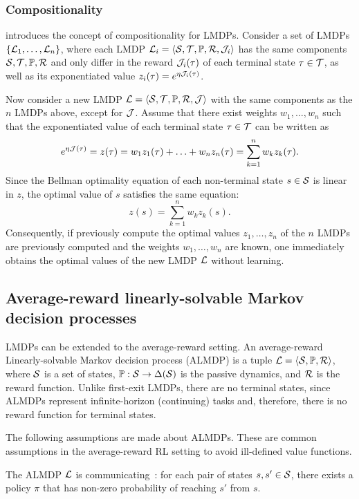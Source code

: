 \subsubsection{Compositionality}
\label{section:compositionality}
\citet{Todorov2009a} introduces the concept of compositionality for LMDPs. Consider a set of LMDPs $\{\mathcal{L}_1,\ldots,\mathcal{L}_n\}$, where each LMDP $\mathcal{L}_i=\langle\mathcal{S},\mathcal{T},\mathbb{P},\mathcal{R},\mathcal{J}_i\rangle$ has the same components $\mathcal{S},\mathcal{T},\mathbb{P},\mathcal{R}$ and only differ in the reward $\mathcal{J}_i(\tau)$ of each terminal state $\tau\in\mathcal{T}$, as well as its exponentiated value $z_i(\tau)=e^{\eta \mathcal{J}_i(\tau)}$.

Now consider a new LMDP $\mathcal{L}=\langle\mathcal{S},\mathcal{T},\mathbb{P},\mathcal{R},\mathcal{J}\rangle$ with the same components as the $n$ LMDPs above, except for $\mathcal{J}$. Assume that there exist weights $w_1,\ldots,w_n$ such that the exponentiated value of each terminal state $\tau\in\mathcal{T}$ can be written as
\[
e^{\eta \mathcal{J}(\tau)} = z(\tau) = w_1z_1(\tau) + \ldots + w_nz_n(\tau) = \sum_{k=1}^n w_kz_k(\tau).
\]
Since the Bellman optimality equation of each non-terminal state $s\in\mathcal{S}$ is linear in $z$, the optimal value of $s$ satisfies the same equation:
\[
z(s) = \sum_{k=1}^n w_kz_k(s).
\]
Consequently, if previously compute the optimal values $z_1,\ldots,z_n$ of the $n$ LMDPs are previously computed and the weights $w_1,\ldots,w_n$ are known, one immediately obtains the optimal values of the new LMDP $\mathcal{L}$ without learning.


\subsection{Average-reward linearly-solvable Markov decision processes}

LMDPs can be extended to the average-reward setting. An average-reward Linearly-solvable Markov decision process (ALMDP) is a tuple
$\mathcal{L} = \langle\mathcal{S},\mathbb{P},\mathcal{R}\rangle$, where $\mathcal{S}$ is a set of states, $\mathbb{P}:\mathcal{S}\rightarrow\Delta(\mathcal{S})$ is the passive dynamics, and $\mathcal{R}$ is the reward function. Unlike first-exit LMDPs, there are no terminal states, since ALMDPs represent infinite-horizon (continuing) tasks and, therefore, there is no reward function for terminal states.  

The following assumptions are made about ALMDPs. These are common assumptions in the average-reward RL setting to avoid ill-defined value functions.

\begin{assumption}
  The ALMDP $\mathcal{L}$ is communicating~\citep{Puterman1994}: for each pair of states $s,s'\in\mathcal{S}$, there exists a policy $\pi$ that has non-zero probability of reaching $s'$ from $s$.
  \label{ass:communicating}
\end{assumption}

